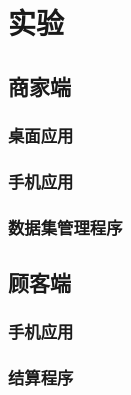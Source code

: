 \newpage
\section{实验}
\label{sec:experiment}

\subsection{商家端}

\subsubsection{桌面应用}

\subsubsection{手机应用}

\subsubsection{数据集管理程序}

\subsection{顾客端}

\subsubsection{手机应用}

\subsubsection{结算程序}